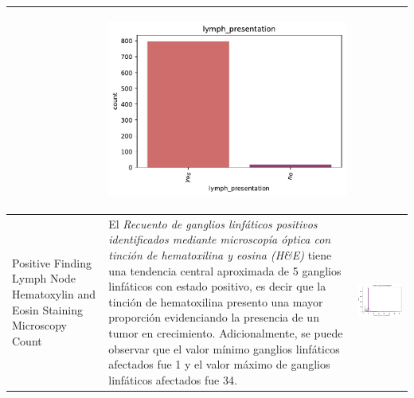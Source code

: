 \begin{table}[!htb]
\begin{threeparttable}
\begin{tabular}{p{2.5cm} p{7cm} p{6.5cm}}
			& \begin{center}\includegraphics[width=1\linewidth]{NOTEBOOK/IMAGENES_DESCRIPTIVAS/22_lymph_presentation}\end{center}
			\\ \hline
			
			Positive Finding Lymph Node Hematoxylin and Eosin Staining Microscopy Count
			& El \textit{Recuento de ganglios linfáticos positivos identificados mediante microscopía óptica con tinción de hematoxilina y eosina (H\&E)} tiene una tendencia central aproximada de 5 ganglios linfáticos con estado positivo, es decir que la tinción de hematoxilina presento una mayor proporción evidenciando la presencia de un tumor en crecimiento. Adicionalmente, se puede observar que  el valor mínimo ganglios linfáticos afectados fue 1 y el valor máximo de ganglios linfáticos afectados fue 34. 
			& \begin{center}\includegraphics[width=1\linewidth]{NOTEBOOK/IMAGENES_DESCRIPTIVAS/23_positive_lymph_hematoxylin}\end{center}
			\\ \hline
		\end{tabular}
	\end{threeparttable}
\end{table}

